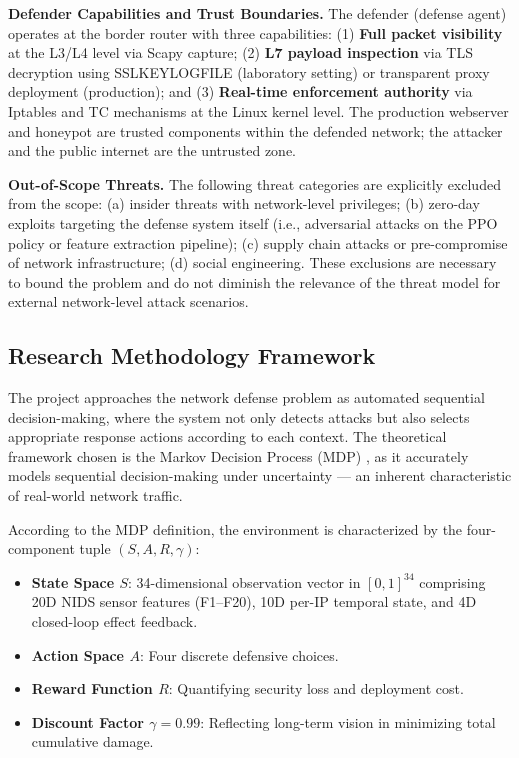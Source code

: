 \documentclass[12pt,a4paper]{report}
\begin{document}
\textbf{Defender Capabilities and Trust Boundaries.} The defender (defense agent) operates at the border router with three capabilities: (1) \textbf{Full packet visibility} at the L3/L4 level via Scapy capture; (2) \textbf{L7 payload inspection} via TLS decryption using SSLKEYLOGFILE (laboratory setting) or transparent proxy deployment (production); and (3) \textbf{Real-time enforcement authority} via Iptables and TC mechanisms at the Linux kernel level. The production webserver and honeypot are trusted components within the defended network; the attacker and the public internet are the untrusted zone.

\textbf{Out-of-Scope Threats.} The following threat categories are explicitly excluded from the scope: (a) insider threats with network-level privileges; (b) zero-day exploits targeting the defense system itself (i.e., adversarial attacks on the PPO policy or feature extraction pipeline); (c) supply chain attacks or pre-compromise of network infrastructure; (d) social engineering. These exclusions are necessary to bound the problem and do not diminish the relevance of the threat model for external network-level attack scenarios.

\subsection{Research Methodology Framework}

The project approaches the network defense problem as automated sequential decision-making, where the system not only detects attacks but also selects appropriate response actions according to each context. The theoretical framework chosen is the Markov Decision Process (MDP) \cite{suttonBarto2018}, as it accurately models sequential decision-making under uncertainty --- an inherent characteristic of real-world network traffic.

According to the MDP definition, the environment is characterized by the four-component tuple $(S, A, R, \gamma)$:
\begin{itemize}
  \item \textbf{State Space $S$}: 34-dimensional observation vector in $[0,1]^{34}$ comprising 20D NIDS sensor features (F1--F20), 10D per-IP temporal state, and 4D closed-loop effect feedback.
  \item \textbf{Action Space $A$}: Four discrete defensive choices.
  \item \textbf{Reward Function $R$}: Quantifying security loss and deployment cost.
  \item \textbf{Discount Factor $\gamma = 0.99$}: Reflecting long-term vision in minimizing total cumulative damage.
\end{itemize}
\end{document}
